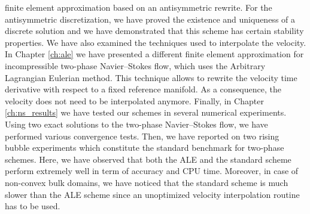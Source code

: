 finite element approximation based on an antisymmetric rewrite. For the
antisymmetric discretization, we have proved the existence and uniqueness of a
discrete solution and we have demonstrated that this scheme has certain
stability properties. We have also examined the techniques used to interpolate
the velocity. In Chapter \ref{ch:ale} we have presented a different finite
element approximation for incompressible two-phase Navier--Stokes flow, which
uses the Arbitrary Lagrangian Eulerian method. This technique allows to
rewrite the velocity time derivative with respect to a fixed reference
manifold. As a consequence, the velocity does not need to be interpolated
anymore. Finally, in Chapter \ref{ch:ns_results} we have tested our schemes in
several numerical experiments. Using two exact solutions to the two-phase
Navier--Stokes flow, we have performed various convergence tests. Then, we have
reported on two rising bubble experiments which constitute the standard
benchmark for two-phase schemes. Here, we have observed that both the ALE and
the standard scheme perform extremely well in term of accuracy and CPU time.
Moreover, in case of non-convex bulk domains, we have noticed that the standard
scheme is much slower than the ALE scheme since an unoptimized velocity
interpolation routine has to be used.